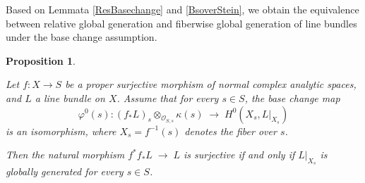 \documentclass[12pt]{amsart}
\numberwithin{equation}{section}
\newtheorem{proposition}[theorem]{Proposition}
\theoremstyle{definition}
\theoremstyle{plain}
\newtheorem*{thm A*}{Theorem A}
\newtheorem*{thm B*}{Theorem B}
\newtheorem*{thm C*}{Theorem C}
\newtheorem*{thm D*}{Theorem D}
\theoremstyle{definition}
\renewcommand{\1}{\mathds{1}}
\renewcommand{\>}{\rightarrow}
\begin{document}
Based on Lemmata \ref{ResBasechange} and \ref{BsoverStein}, we obtain the equivalence between relative global generation and fiberwise global generation of line bundles under the base change assumption.
\begin{proposition}\label{Bslocus}

Let $f: X \to S$ be a proper surjective morphism of normal complex analytic spaces, and $L$ a line bundle on $X$. 
Assume that for every $s \in S$, the base change map
\[
\varphi^0(s): (f_* L)_s \otimes_{\mathcal{O}_{S,s}} \kappa(s) \;\longrightarrow\; H^0(X_s, L|_{X_s})
\]
is an isomorphism, where $X_s = f^{-1}(s)$ denotes the fiber over $s$.

Then the natural morphism
$f^{*} f_{*} L \;\longrightarrow\; L$ is surjective if and only if $L|_{X_s}$ is globally generated for every $s \in S$.
\end{proposition}
\end{document}
